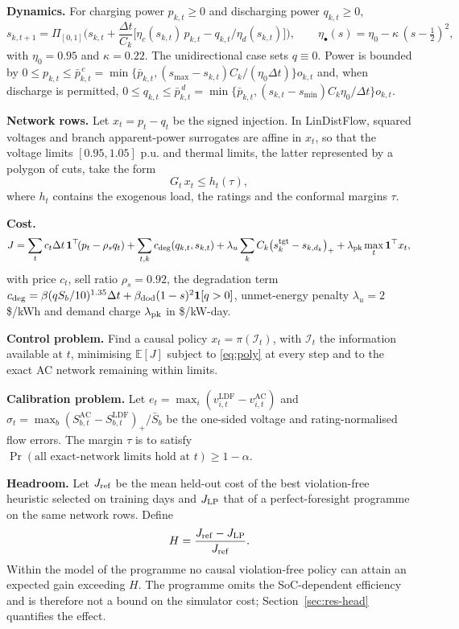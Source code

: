 \documentclass[11pt]{article}
\newcommand{\ldf}{\mathrm{LDF}}
\newcommand{\ac}{\mathrm{AC}}
\begin{document}
\textbf{Dynamics.} For charging power $p_{k,t}\ge0$ and discharging power $q_{k,t}\ge0$,
\begin{equation}
s_{k,t+1}=\Pi_{[0,1]}\Big(s_{k,t}+\frac{\Delta t}{C_k}\big[\eta_c(s_{k,t})\,p_{k,t}-q_{k,t}/\eta_d(s_{k,t})\big]\Big),\qquad \eta_\bullet(s)=\eta_0-\kappa\,(s-\tfrac12)^2,
\end{equation}
with $\eta_0=0.95$ and $\kappa=0.22$. The unidirectional case sets $q\equiv0$. Power is bounded by $0\le p_{k,t}\le\bar p^{\,c}_{k,t}=\min\{\bar p_{k,t},(s_{\max}-s_{k,t})C_k/(\eta_0\Delta t)\}o_{k,t}$ and, when discharge is permitted, $0\le q_{k,t}\le\bar p^{\,d}_{k,t}=\min\{\bar p_{k,t},(s_{k,t}-s_{\min})C_k\eta_0/\Delta t\}o_{k,t}$.

\textbf{Network rows.} Let $x_t=p_t-q_t$ be the signed injection. In LinDistFlow, squared voltages and branch apparent-power surrogates are affine in $x_t$, so that the voltage limits $[0.95,1.05]$ p.u. and thermal limits, the latter represented by a polygon of cuts, take the form
\begin{equation}
G_t\,x_t\le h_t(\tau),\label{eq:poly}
\end{equation}
where $h_t$ contains the exogenous load, the ratings and the conformal margins $\tau$.

\textbf{Cost.}
\begin{equation}
J=\sum_t c_t\Delta t\,\mathbf 1^\top\!(p_t-\rho_s q_t)+\sum_{t,k}c_{\rm deg}(q_{k,t},s_{k,t})+\lambda_u\sum_k C_k\big(s^{\rm tgt}_k-s_{k,d_k}\big)_+ +\lambda_{\rm pk}\max_t \mathbf 1^\top x_t,
\end{equation}
with price $c_t$, sell ratio $\rho_s=0.92$, the degradation term $c_{\rm deg}=\beta (q S_b/10)^{1.35}\Delta t+\beta_{\rm dod}(1-s)^2\mathbf 1[q>0]$, unmet-energy penalty $\lambda_u=2$ \$/kWh and demand charge $\lambda_{\rm pk}$ in \$/kW-day.

\textbf{Control problem.} Find a causal policy $x_t=\pi(\mathcal I_t)$, with $\mathcal I_t$ the information available at $t$, minimising $\mathbb E[J]$ subject to \eqref{eq:poly} at every step and to the exact AC network remaining within limits.

\textbf{Calibration problem.} Let $e_t=\max_i(v^\ldf_{i,t}-v^\ac_{i,t})$ and $\sigma_t=\max_b(S^\ac_{b,t}-S^\ldf_{b,t})_+/\bar S_b$ be the one-sided voltage and rating-normalised flow errors. The margin $\tau$ is to satisfy $\Pr(\text{all exact-network limits hold at }t)\ge1-\alpha$.

\textbf{Headroom.} Let $J_{\rm ref}$ be the mean held-out cost of the best violation-free heuristic selected on training days and $J_{\rm LP}$ that of a perfect-foresight programme on the same network rows. Define
\begin{equation}
H=\frac{J_{\rm ref}-J_{\rm LP}}{J_{\rm ref}}.
\end{equation}
Within the model of the programme no causal violation-free policy can attain an expected gain exceeding $H$. The programme omits the SoC-dependent efficiency and is therefore not a bound on the simulator cost; Section~\ref{sec:res-head} quantifies the effect.
\end{document}

